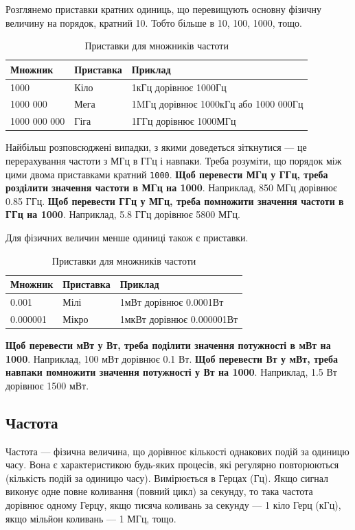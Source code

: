 \documentclass{article}
\begin{document}
Розглянемо приставки кратних одиниць, що перевищують основну фізичну величину на порядок, кратний 10. Тобто більше в 10, 100, 1000, тощо.

\begin{table}[ht]
\centering
\begin{tabular}{|l|l|l|}
\hline
\textbf{Множник} & \textbf{Приставка}  & \textbf{Приклад} \\
\hline
1000           & Кіло   & 1кГц дорівнює 1000Гц \\
1000 000       & Мега   & 1MГц дорівнює 1000кГц або 1000 000Гц \\
1000 000 000   & Гіга   & 1ГГц дорівнює 1000МГц \\
\hline
\end{tabular}
\caption{Приставки для множників частоти}
\end{table}

Найбільш розповсюджені випадки, з якими доведеться зіткнутися --- це перерахування частоти з МГц в ГГц і навпаки. Треба розуміти, що порядок між цими двома приставками кратний \texttt{1000}. \textbf{Щоб перевести МГц у ГГц, треба розділити значення частоти в МГц на 1000}. Наприклад, 850 МГц дорівнює 0.85 ГГц. \textbf{Щоб перевести ГГц у МГц, треба помножити значення частоти в ГГц на 1000}. Наприклад, 5.8 ГГц дорівнює 5800 МГц.

\newpage
Для фізичних величин менше одиниці також є приставки.

\begin{table}[ht]
\centering
\begin{tabular}{|l|l|l|}
\hline
\textbf{Множник} & \textbf{Приставка}  & \textbf{Приклад} \\
\hline
0.001           & Мілі   & 1мВт дорівнює 0.0001Вт \\
0.000001        & Мікро  & 1мкВт дорівнює 0.000001Вт \\
\hline
\end{tabular}
\caption{Приставки для множників частоти}
\end{table}

\textbf{Щоб перевести мВт у Вт, треба поділити значення потужності в мВт на 1000}. Наприклад, 100 мВт дорівнює 0.1 Вт. \textbf{Щоб перевести Вт у мВт, треба навпаки помножити значення потужності у Вт на 1000}. Наприклад, 1.5 Вт дорівнює 1500 мВт.

\subsection{Частота}
Частота --- фізична величина, що дорівнює кількості однакових подій за одиницю часу. Вона є характеристикою будь-яких процесів, які регулярно повторюються (кількість подій за одиницю часу). Вимірюється в Герцах (Гц). Якщо сигнал виконує одне повне коливання (повний цикл) за секунду, то така частота дорівнює одному Герцу, якщо тисяча коливань за секунду --- 1 кіло Герц (кГц), якщо мільйон коливань --- 1 МГц, тощо.
\end{document}
